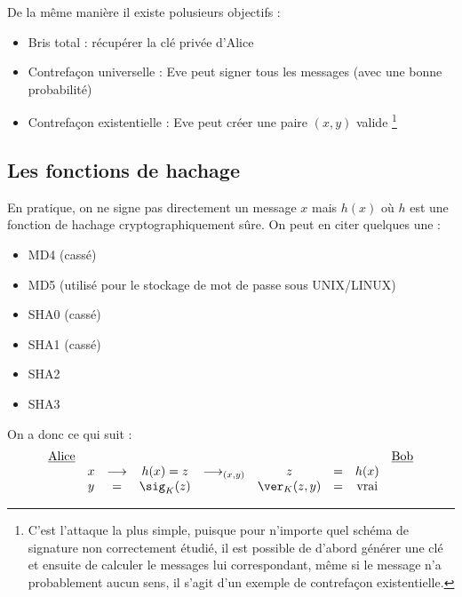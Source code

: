 \documentclass[a4paper, 10pt]{thesis}
\begin{document}
De la même manière il existe polusieurs objectifs :
\begin{itemize}
    \item Bris total : récupérer la clé privée d'Alice
    \item Contrefaçon universelle : Eve peut signer tous les messages (avec une bonne probabilité)
    \item Contrefaçon existentielle : Eve peut créer une paire $(x, y)$ valide \footnote{C'est
            l'attaque la plus simple, puisque pour n'importe quel schéma de signature non
            correctement étudié, il est possible de d'abord générer une clé et ensuite de calculer
            le messages lui correspondant, même si le message n'a probablement aucun sens, il s'agit
        d'un exemple de contrefaçon existentielle.}
\end{itemize}

\subsection{Les fonctions de hachage}

En pratique, on ne signe pas directement un message $x$ mais $h(x)$ où $h$ est une fonction de
hachage cryptographiquement sûre. On peut en citer quelques une : \begin{itemize}
    \item MD4 (cassé)
    \item MD5 (utilisé pour le stockage de mot de passe sous UNIX/LINUX)
    \item SHA0 (cassé)
    \item SHA1 (cassé)
    \item SHA2
    \item SHA3
\end{itemize}

On a donc ce qui suit :
\begin{displaymath}
    \begin{array}{rcccccccl}
        \underline{\mbox{Alice}} & & & & & & & & \underline{\mbox{Bob}} \\
                                 & x & \longrightarrow & h(x) = z & \longrightarrow_{(x,y)} & z & =
        & h(x) & \\
        & y & = & \sig_K(z) & & \ver_K(z,y) & = & \mbox{vrai} & \\
    \end{array}
\end{displaymath}
\end{document}
